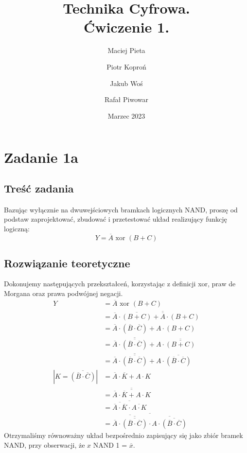 \documentclass{article}
\author{Maciej Pieta \and Piotr Koproń \and Jakub Woś \and Rafał Piwowar}
\date{Marzec 2023}
\title{Technika Cyfrowa. \\ Ćwiczenie 1.}
\begin{document}
\maketitle
\newpage
\section{Zadanie 1a}
\subsection{Treść zadania}
\paragraph{}
Bazując wyłącznie na dwuwejściowych bramkach logicznych NAND, proszę od podstaw  zaprojektować, zbudować i przetestować układ realizujący funkcję logiczną:
\begin{equation}
Y = \overline{A} \text{ xor } (B + C)
\end{equation}
\subsection{Rozwiązanie teoretyczne}
Dokonujemy następujących przekształceń, korzystając z definicji xor, praw de Morgana oraz prawa podwójnej negacji.
\begin{align*}
 Y &= \overline{A} \text{ xor } (B + C) \\
 &= \overline{A} \cdot \overline{(B+C)} + \overline{\overline{A}} \cdot (B+C)\\
&= \overline{A} \cdot (\overline{B} \cdot \overline{C}) + A \cdot (B+C)\\
&= \overline{A} \cdot \overline{\overline{(\overline{B} \cdot \overline{C})}} + A \cdot \overline{\overline{(B+C)}} \\
&= \overline{A} \cdot \overline{\overline{(\overline{B} \cdot \overline{C})}} + A \cdot \overline{(\overline{B} \cdot \overline{C})} \\
|K = \overline{(\overline{B} \cdot \overline{C})}| &= \overline{A} \cdot \overline{K} + A \cdot K \\
&= \overline{\overline{\overline{A} \cdot \overline{K} + A \cdot K}} \\
&= \overline{\overline{\overline{A} \cdot \overline{K}} \cdot \overline{A \cdot K}} \\
&= \overline{\overline{\overline{A} \cdot \overline{\overline{(\overline{B} \cdot \overline{C})}}} \cdot \overline{A \cdot \overline{(\overline{B} \cdot \overline{C})}}}
\end{align*}
Otrzymaliśmy równoważny układ bezpośrednio zapisujący się jako zbiór bramek NAND, przy obserwacji, że $x$ NAND 1 = $\overline{x}$.
\newpage
\end{document}
